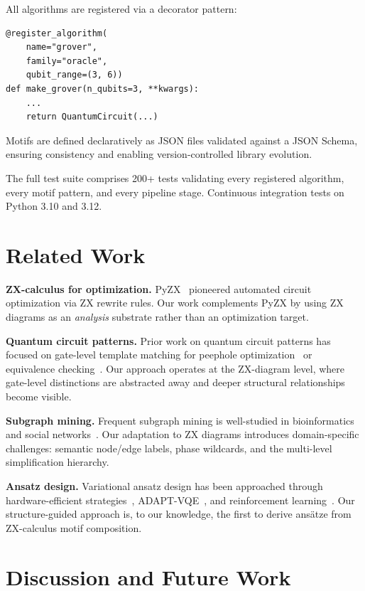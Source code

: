 \documentclass[twocolumn,prl,amsmath,amssymb,superscriptaddress]{revtex4-2}
\begin{document}
All algorithms are registered via a decorator pattern:
\begin{verbatim}
@register_algorithm(
    name="grover",
    family="oracle",
    qubit_range=(3, 6))
def make_grover(n_qubits=3, **kwargs):
    ...
    return QuantumCircuit(...)
\end{verbatim}

Motifs are defined declaratively as JSON files validated against a JSON Schema, ensuring consistency and enabling version-controlled library evolution.

The full test suite comprises 200+ tests validating every registered algorithm, every motif pattern, and every pipeline stage.
Continuous integration tests on Python 3.10 and 3.12.

\section{Related Work}
\label{sec:related}

\textbf{ZX-calculus for optimization.}
PyZX~\cite{Kissinger2020} pioneered automated circuit optimization via ZX rewrite rules.
Our work complements PyZX by using ZX diagrams as an \emph{analysis} substrate rather than an optimization target.

\textbf{Quantum circuit patterns.}
Prior work on quantum circuit patterns has focused on gate-level template matching for peephole optimization~\cite{Nam2018} or equivalence checking~\cite{Amy2019}.
Our approach operates at the ZX-diagram level, where gate-level distinctions are abstracted away and deeper structural relationships become visible.

\textbf{Subgraph mining.}
Frequent subgraph mining is well-studied in bioinformatics and social networks~\cite{Yan2002}.
Our adaptation to ZX diagrams introduces domain-specific challenges: semantic node/edge labels, phase wildcards, and the multi-level simplification hierarchy.

\textbf{Ansatz design.}
Variational ansatz design has been approached through hardware-efficient strategies~\cite{Kandala2017}, ADAPT-VQE~\cite{Grimsley2019}, and reinforcement learning~\cite{Kuo2021}.
Our structure-guided approach is, to our knowledge, the first to derive ansätze from ZX-calculus motif composition.

\section{Discussion and Future Work}
\label{sec:discussion}
\end{document}
